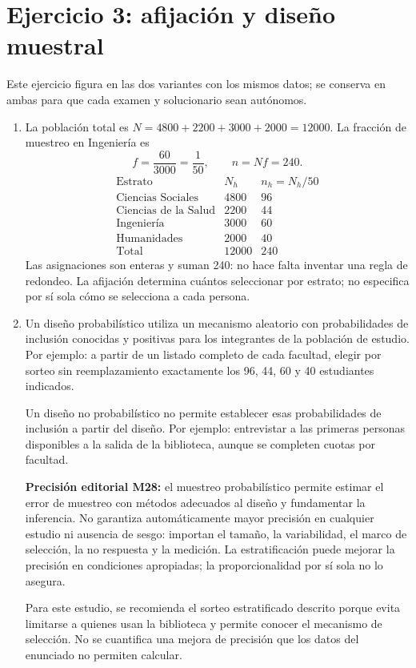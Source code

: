 \documentclass[11pt]{article}
\begin{document}
\section*{Ejercicio 3: afijación y diseño muestral}
Este ejercicio figura en las dos variantes con los mismos datos; se conserva en ambas para que cada examen y solucionario sean autónomos.
\begin{enumerate}[label=(\alph*)]
\item La población total es $N=4800+2200+3000+2000=12000$. La fracción de muestreo en Ingeniería es
\[
f=\frac{60}{3000}=\frac1{50},\qquad n=Nf=\boxed{240}.
\]
\[
\begin{array}{l|r|r}
\text{Estrato}&N_h&n_h=N_h/50\\\hline
\text{Ciencias Sociales}&4800&96\\
\text{Ciencias de la Salud}&2200&44\\
\text{Ingeniería}&3000&60\\
\text{Humanidades}&2000&40\\\hline
\text{Total}&12000&240
\end{array}
\]
Las asignaciones son enteras y suman 240: no hace falta inventar una regla de redondeo. La afijación determina cuántos seleccionar por estrato; no especifica por sí sola cómo se selecciona a cada persona.
\item Un diseño probabilístico utiliza un mecanismo aleatorio con probabilidades de inclusión conocidas y positivas para los integrantes de la población de estudio. Por ejemplo: a partir de un listado completo de cada facultad, elegir por sorteo sin reemplazamiento exactamente los 96, 44, 60 y 40 estudiantes indicados.

Un diseño no probabilístico no permite establecer esas probabilidades de inclusión a partir del diseño. Por ejemplo: entrevistar a las primeras personas disponibles a la salida de la biblioteca, aunque se completen cuotas por facultad.

\textbf{Precisión editorial M28:} el muestreo probabilístico permite estimar el error de muestreo con métodos adecuados al diseño y fundamentar la inferencia. No garantiza automáticamente mayor precisión en cualquier estudio ni ausencia de sesgo: importan el tamaño, la variabilidad, el marco de selección, la no respuesta y la medición. La estratificación puede mejorar la precisión en condiciones apropiadas; la proporcionalidad por sí sola no lo asegura.

Para este estudio, se recomienda el sorteo estratificado descrito porque evita limitarse a quienes usan la biblioteca y permite conocer el mecanismo de selección. No se cuantifica una mejora de precisión que los datos del enunciado no permiten calcular.
\end{enumerate}
\end{document}
